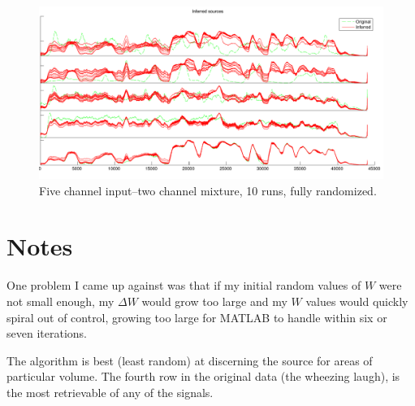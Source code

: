 \documentclass[11pt]{report}
\begin{document}
\begin{figure}[H]
  \centering
  \includegraphics[width=\textwidth]{../plots/5channels10-2mix.pdf}
  \caption{Five channel input--two channel mixture, 10 runs, fully randomized.}
  \label{fig:f}
\end{figure}

\section{Notes}

One problem I came up against was that if my initial random values of $W$ were not small enough, my $\Delta W$ would grow too large and my $W$ values would quickly spiral out of control, growing too large for MATLAB to handle within six or seven iterations.

The algorithm is best (least random) at discerning the source for areas of particular volume. The fourth row in the original data (the wheezing laugh), is the most retrievable of any of the signals.



\end{document}
